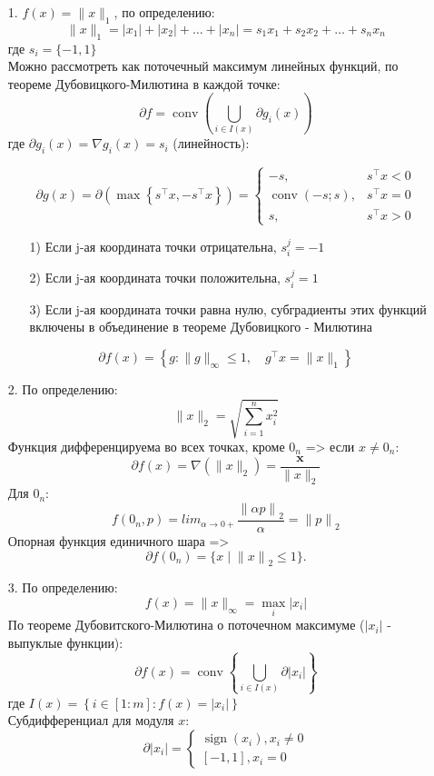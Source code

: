 \documentclass[12pt,letterpaper]{article}
\begin{document}
\begin{itemize}
	\item[1. ] $ f(x) = \| x \|_1 $, по определению:
	$$
\|x\|_{1}=\left|x_{1}\right|+\left|x_{2}\right|+\ldots+\left|x_{n}\right|=s_{1} x_{1}+s_{2} x_{2}+\ldots+s_{n} x_{n}
$$
где $ s_i = \{ -1, 1 \} $\\
Можно рассмотреть как поточечный максимум линейных функций, по теореме Дубовицкого-Милютина в каждой точке:
$$
\partial f=\operatorname{conv}\left(\bigcup_{i \in I\left(x\right)} \partial g_{i}(x)\right)
$$
где $ \partial g_i(x) = \nabla g_i(x) = s_i $ (линейность):

$$
\partial g(x)=\partial\left(\max \left\{s^{\top} x,-s^{\top} x\right\}\right)=\left\{\begin{array}{ll}
-s, & s^{\top} x<0 \\
\operatorname{conv}(-s ; s), & s^{\top} x=0 \\
s, & s^{\top} x>0
\end{array}\right.
$$

\begin{itemize}
\item[1) ]  Если j-ая координата точки отрицательна, $s_i^j = -1$
\item[2) ] Если j-ая координата точки положительна, $s_i^j = 1$
\item[3) ] Если j-ая координата точки равна нулю, субградиенты этих функций включены в объединение в теореме Дубовицкого - Милютина
\end{itemize}

$$
\partial f(x)=\left\{g:\|g\|_{\infty} \leq 1, \quad g^{\top} x=\|x\|_{1}\right\}
$$


	\item[2. ] По определению:
$$
\|x\|_{2}= \sqrt{\sum\limits_{i=1}^n x_i^2} 
$$ 
Функция дифференцируема во всех точках, кроме $0_n$ => если $x\neq0_n$:
$$
\partial f(x) = \nabla (\|x\|_{2}) = \frac{\textbf{x} }{\| x \|_2} 
$$
Для $0_n$:
$$f(0_n, p)=lim _{\alpha\rightarrow0+}\frac{{\parallel\alpha p\parallel}_2}{\alpha}={\parallel p\parallel}_2$$
Опорная функция единичного шара => $$\partial f(0_n)=\{x\mid{\parallel x\parallel}_2\leqslant1\}.$$

	\item[3. ] По определению:
$$
f(x) = \| x \|_{\infty} = \max\limits_i |x_i|
$$
По теореме Дубовитского-Милютина о поточечном максимуме ($ |x_i| $ - выпуклые функции):
$$
\partial f(x) = \operatorname{conv}\left\{\bigcup_{i \in I\left(x\right)} \partial |x_i| \right\}
$$
где $
I(x)=\left\{i \in[1: m]: f(x)=|x_i|\right\}
$\\
Субдифференциал для модуля $ x $:
$$
\partial\left|x_{i}\right|=\left\{\begin{array}{l}
\operatorname{sign}\left(x_{i}\right), x_i \neq 0 \\
{[-1,1], x_i=0}
\end{array}\right.
$$


\end{itemize}
\end{document}
